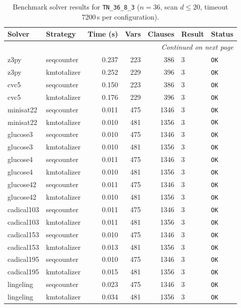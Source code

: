 \begin{longtable}{llrrrl p{}}
\caption{Benchmark solver results for \texttt{TN\_36\_8\_3} ($n=36$, scan $d \leq 20$, timeout 7200\,s per configuration).} \label{tab:bench-TN_36_8_3} \\
\toprule
Solver & Strategy & Time (s) & Vars & Clauses & Result & Status \\
\midrule
\endhead
\midrule
\multicolumn{7}{r}{\textit{Continued on next page}} \\
\midrule
\endfoot
\bottomrule
\endlastfoot
z3py & seqcounter & 0.237 & 223 & 386 & 3 & \texttt{OK} \\
z3py & kmtotalizer & 0.252 & 229 & 396 & 3 & \texttt{OK} \\
cvc5 & seqcounter & 0.150 & 223 & 386 & 3 & \texttt{OK} \\
cvc5 & kmtotalizer & 0.176 & 229 & 396 & 3 & \texttt{OK} \\
minisat22 & seqcounter & 0.011 & 475 & 1346 & 3 & \texttt{OK} \\
minisat22 & kmtotalizer & 0.010 & 481 & 1356 & 3 & \texttt{OK} \\
glucose3 & seqcounter & 0.010 & 475 & 1346 & 3 & \texttt{OK} \\
glucose3 & kmtotalizer & 0.010 & 481 & 1356 & 3 & \texttt{OK} \\
glucose4 & seqcounter & 0.011 & 475 & 1346 & 3 & \texttt{OK} \\
glucose4 & kmtotalizer & 0.010 & 481 & 1356 & 3 & \texttt{OK} \\
glucose42 & seqcounter & 0.011 & 475 & 1346 & 3 & \texttt{OK} \\
glucose42 & kmtotalizer & 0.010 & 481 & 1356 & 3 & \texttt{OK} \\
cadical103 & seqcounter & 0.011 & 475 & 1346 & 3 & \texttt{OK} \\
cadical103 & kmtotalizer & 0.011 & 481 & 1356 & 3 & \texttt{OK} \\
cadical153 & seqcounter & 0.010 & 475 & 1346 & 3 & \texttt{OK} \\
cadical153 & kmtotalizer & 0.013 & 481 & 1356 & 3 & \texttt{OK} \\
cadical195 & seqcounter & 0.010 & 475 & 1346 & 3 & \texttt{OK} \\
cadical195 & kmtotalizer & 0.015 & 481 & 1356 & 3 & \texttt{OK} \\
lingeling & seqcounter & 0.023 & 475 & 1346 & 3 & \texttt{OK} \\
lingeling & kmtotalizer & 0.034 & 481 & 1356 & 3 & \texttt{OK} \\

\end{longtable}
